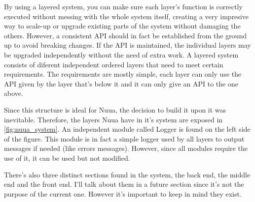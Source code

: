 By using a layered system, you can make sure each layer's function is correctly executed without
messing with the whole system itself, creating a very impresive way to scale-up or upgrade existing
parts of the system without damaging the others. However, a consistent API should in fact be established
from the ground up to avoid breaking changes. If the API is maintained, the individual layers may be
upgraded independently without the need of extra work. A layered system consists of diferent independent
ordered layers that need to meet certain requirements. The requirements are mostly simple, each layer can
only use the API given by the layer that's below it and it can only give an API to the one above.

Since this structure is ideal for Nuua, the decision to build it upon it was inevitable. Therefore, the layers
Nuua have in it's system are exposed in \autoref{fig:nuua_system}. An independent module called Logger is found
on the left side of the figure. This module is in fact a simple logger used by all layers to output messages if
needed (like errors messages). However, since all modules require the use of it, it can be used but not modified.

There's also three distinct sections found in the system, the back end, the middle end and the front end. I'll talk about them in
a future section since it's not the purpose of the current one. However it's important to keep in mind they exist.

